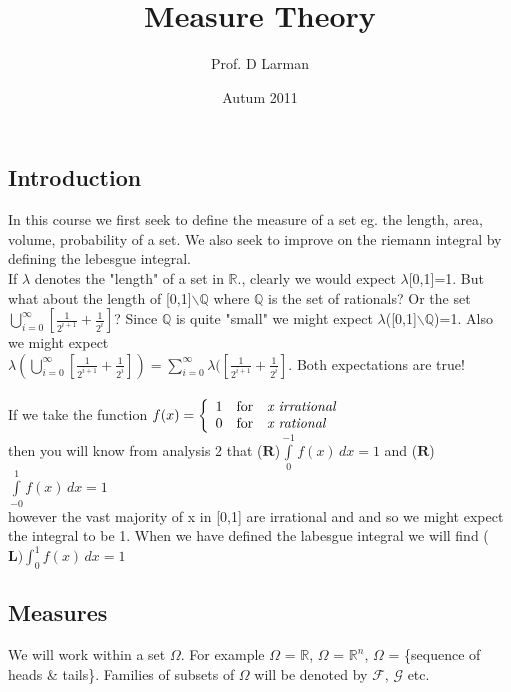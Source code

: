 \documentclass[12pt]{article}
\def\QQ{\mathbb{Q}}
\def\RR{\mathbb{R}}
\begin{document}
\begin{titlepage}
\title{Measure Theory}
\author{Prof. D Larman}
\date{Autum 2011}
\maketitle

\section*{Introduction} In this course we first seek to define the measure of a set eg. the length, area, volume, probability of a set. We also seek to improve on the riemann integral by defining the lebesgue integral.\\
 If $\lambda$ denotes the "length" of a set in $\RR$., clearly we would expect $\lambda$[0,1]=1. But what about the length of [0,1]$\backslash\QQ$ where $\QQ$ is the set of rationals? Or the set $\bigcup_{i=0}^{\infty}[\frac{1}{2^{i+1}} +\frac{1}{2^i} ]$? Since $\QQ$ is quite "small" we might expect $\lambda$([0,1]$\backslash\QQ$)=1. Also we might expect\\ \(\lambda(\bigcup_{i=0}^{\infty}[\frac{1}{2^{i+1}} +\frac{1}{2^i} ])=\sum_{i=0}^{\infty}\lambda([\frac{1}{2^{i+1}} +\frac{1}{2^i} ]\). Both expectations are true!\\\\
If we take the function $f(x) = \left\{ \begin{array}{rcl}
1 & \mbox{for} &
\mbox{\emph{x irrational}} \\ 0 & \mbox{for} & \mbox{\emph{x rational}} \\
\end{array}\right.$ \\then you will know from analysis 2 that ($\mathbf{R}$)$\int\limits_{0}^{-1}f(x)\,dx =1$ and ($\mathbf{R}$)$\int\limits_{-0}^{1}f(x)\,dx =1$
\\ however the vast majority of x in [0,1] are irrational and and so we might expect the integral to be 1. When we have defined the labesgue integral we will find ($\mathbf{L})\int_{0}^{1}f(x)\,dx =1$
\end{titlepage}
\begin{center}
\section{Measures}
\end{center}

We will work within a set $\Omega$. For example $\Omega$ = $\RR$, $\Omega$ = $\RR^n$, $\Omega$ = \{sequence of heads \& tails\}. Families of subsets of $\Omega$ will be denoted by $\mathcal{F}$, $\mathcal{G}$ etc.\\
\end{document}
